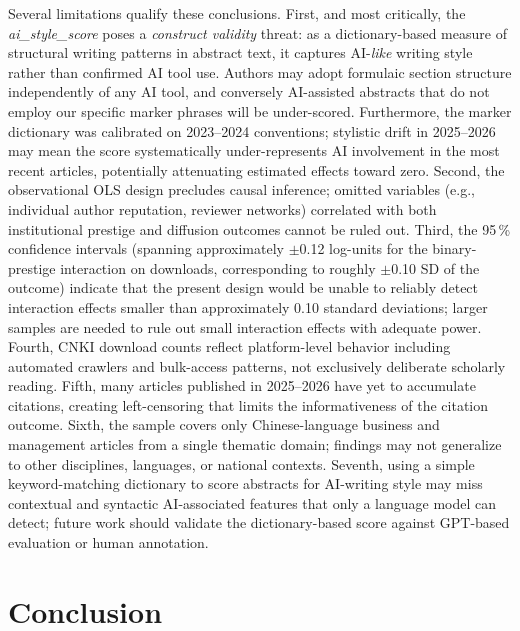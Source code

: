 \documentclass[12pt,a4paper]{article}
\begin{document}
Several limitations qualify these conclusions.
First, and most critically, the \textit{ai\_style\_score} poses a
\textit{construct validity} threat: as a dictionary-based measure
of structural writing patterns in abstract text,
it captures AI-\textit{like} writing style rather than confirmed
AI tool use.
Authors may adopt formulaic section structure independently of any AI
tool, and conversely AI-assisted abstracts that do not employ
our specific marker phrases will be under-scored.
Furthermore, the marker dictionary was calibrated on 2023--2024
conventions; stylistic drift in 2025--2026 may mean the score
systematically under-represents AI involvement in the most recent
articles, potentially attenuating estimated effects toward zero.
Second, the observational OLS design precludes causal inference;
omitted variables (e.g., individual author reputation, reviewer networks)
correlated with both institutional prestige and diffusion outcomes
cannot be ruled out.
Third, the 95\,\% confidence intervals (spanning approximately
$\pm$0.12 log-units for the binary-prestige interaction on downloads,
corresponding to roughly $\pm$0.10 SD of the outcome)
indicate that the present design would be unable to reliably detect
interaction effects smaller than approximately 0.10 standard deviations;
larger samples are needed to rule out small interaction effects with
adequate power.
Fourth, CNKI download counts reflect platform-level behavior including
automated crawlers and bulk-access patterns, not exclusively deliberate
scholarly reading.
Fifth, many articles published in 2025--2026 have yet to accumulate
citations, creating left-censoring that limits the informativeness of
the citation outcome.
Sixth, the sample covers only Chinese-language business and management
articles from a single thematic domain; findings may not generalize
to other disciplines, languages, or national contexts.
Seventh, using a simple keyword-matching dictionary to score abstracts
for AI-writing style may miss contextual and syntactic AI-associated
features that only a language model can detect; future work should
validate the dictionary-based score against GPT-based evaluation or
human annotation.

\section{Conclusion}
\label{sec:conclusion}
\end{document}
